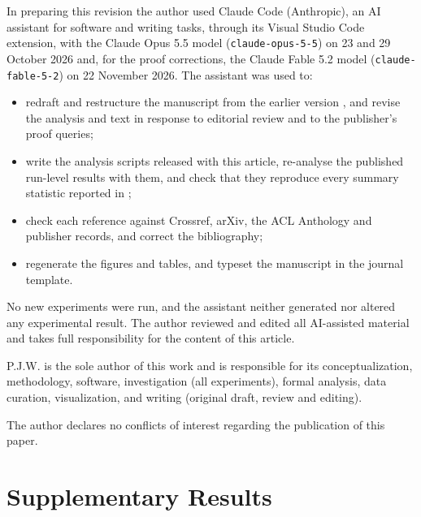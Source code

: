 \documentclass{ijis}
\begin{document}
In preparing this revision the author used Claude Code (Anthropic), an AI assistant for software and writing tasks, through its Visual Studio Code extension, with the Claude Opus 5.5 model (\texttt{claude-opus-5-5}) on 23 and 29 October 2026 and, for the proof corrections, the Claude Fable 5.2 model (\texttt{claude-fable-5-2}) on 22 November 2026. The assistant was used to:
\begin{itemize}
\item redraft and restructure the manuscript from the earlier version \cite{worth2025layercake}, and revise the analysis and text in response to editorial review and to the publisher's proof queries;
\item write the analysis scripts released with this article, re-analyse the published run-level results with them, and check that they reproduce every summary statistic reported in \cite{worth2025layercake};
\item check each reference against Crossref, arXiv, the ACL Anthology and publisher records, and correct the bibliography;
\item regenerate the figures and tables, and typeset the manuscript in the journal template.
\end{itemize}
No new experiments were run, and the assistant neither generated nor altered any experimental result. The author reviewed and edited all AI-assisted material and takes full responsibility for the content of this article.

P.J.W. is the sole author of this work and is responsible for its conceptualization, methodology, software, investigation (all experiments), formal analysis, data curation, visualization, and writing (original draft, review and editing).

The author declares no conflicts of interest regarding the publication of this paper.




\appendix
\renewcommand{\thesection}{\Alph{section}}
\setcounter{table}{0}
\renewcommand{\thetable}{A\arabic{table}}
\section{Supplementary Results}
\end{document}
